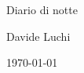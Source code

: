 \newcommand{\BookTitle}{\Huge Diario di notte} %
\newcommand{\BookAuthor}{Davide Luchi} %



\begin{titlepage}
    \centering
    \vspace*{5cm} %
    {\BookTitle \par}
    \vspace{2cm}
    {\BookAuthor \par}
    \vfill
    {\small \today} %
\end{titlepage}
